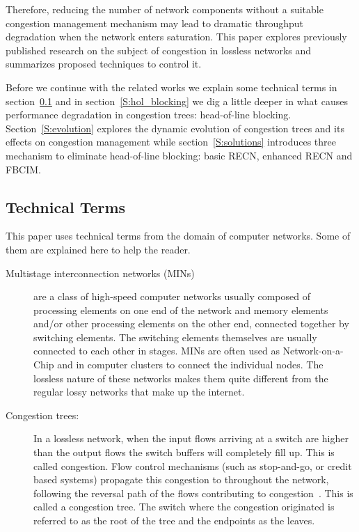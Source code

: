 \documentclass[12pt]{article}
\begin{document}
Therefore, reducing the number of network components without a suitable congestion management mechanism may lead to dramatic throughput degradation when the network enters saturation.
This paper explores previously published research on the subject of congestion in lossless networks and summarizes proposed techniques to control it.

Before we continue with the related works we explain some technical terms in section~\ref{S:terms} and in section~\ref{S:hol_blocking} we dig a little deeper in what causes performance degradation in congestion trees: head-of-line blocking. Section~\ref{S:evolution} explores the dynamic evolution of congestion trees and its effects on congestion management while section~\ref{S:solutions} introduces three mechanism to eliminate head-of-line blocking: basic RECN, enhanced RECN and FBCIM.

\subsection{Technical Terms}\label{S:terms}
This paper uses technical terms from the domain of computer networks. Some of them are explained here to help the reader.

\begin{description}

\item[Multistage interconnection networks (MINs)] are a class of high-speed computer networks usually composed of processing elements on one end of the network and memory elements and/or other processing elements on the other end, connected together by switching elements. The switching elements themselves are usually connected to each other in stages. MINs are often used as Network-on-a-Chip and in computer clusters to connect the individual nodes. The lossless nature of these networks makes them quite different from the regular lossy networks that make up the internet.

\item[Congestion trees:] In a lossless network, when the input flows arriving at a switch are higher than the output flows the switch buffers will completely fill up. This is called congestion. Flow control mechanisms (such as stop-and-go, or credit based systems) propagate this congestion to throughout the network, following the reversal path of the flows contributing to congestion~\cite{paper1}. This is called a congestion tree. The switch where the congestion originated is referred to as the root of the tree and the endpoints as the leaves. 

\end{description}
\end{document}
